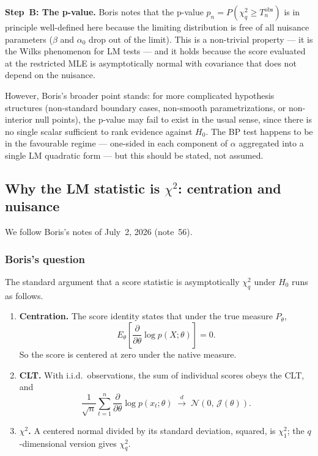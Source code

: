 \documentclass[a4paper,oneside,12pt]{extarticle}
\theoremstyle{plain}
\theoremstyle{definition}
\theoremstyle{remark}
\begin{document}
\textbf{Step~B: The p-value.}  Boris notes that the p-value
$p_n = P(\chi^2_q \geq T_n^{\mathrm{obs}})$ is in principle
well-defined here because the limiting distribution is free of all
nuisance parameters ($\beta$ and $\alpha_0$ drop out of the limit).
This is a non-trivial property — it is the Wilks phenomenon for LM
tests — and it holds because the score evaluated at the restricted MLE
is asymptotically normal with covariance that does not depend on the
nuisance.

However, Boris's broader point stands: for more complicated hypothesis
structures (non-standard boundary cases, non-smooth parametrizations,
or non-interior null points), the p-value may fail to exist in the
usual sense, since there is no single scalar sufficient to rank
evidence against $H_0$.  The BP test happens to be in the favourable
regime — one-sided in each component of $\alpha$ aggregated into a
single LM quadratic form — but this should be stated, not assumed.


\subsection{Why the LM statistic is \texorpdfstring{$\chi^2$}{chi-squared}: centration and nuisance}
\label{subsec:chisq-centration}

We follow Boris's notes of July~2, 2026 (note~56).

\subsubsection*{Boris's question}

The standard argument that a score statistic is asymptotically $\chi^2_q$
under $H_0$ runs as follows.

\begin{enumerate}
\item \textbf{Centration.}  The score identity states that under the
  true measure $P_\theta$,
  \[
    E_\theta\!\left[\frac{\partial}{\partial\theta}\log p(X;\theta)\right] = 0.
  \]
  So the score is centered at zero under the native measure.

\item \textbf{CLT.}  With i.i.d.\ observations, the sum of individual
  scores obeys the CLT, and
  \[
    \frac{1}{\sqrt{n}}\sum_{t=1}^n \frac{\partial}{\partial\theta}\log p(x_t;\theta)
    \;\xrightarrow{d}\; \mathcal{N}(0,\,\mathcal{J}(\theta)).
  \]

\item \textbf{$\chi^2$.}  A centered normal divided by its standard
  deviation, squared, is $\chi^2_1$; the $q$-dimensional version gives
  $\chi^2_q$.
\end{enumerate}
\end{document}
